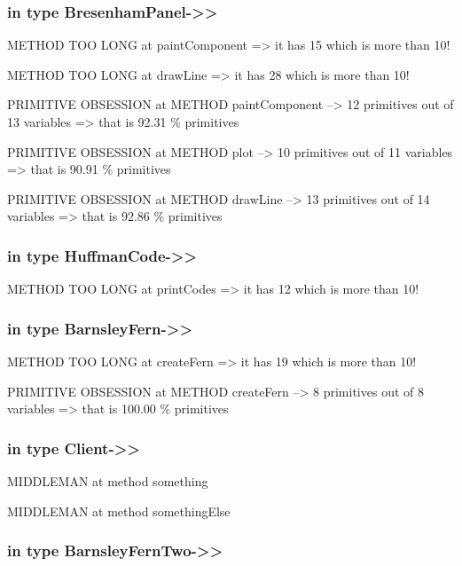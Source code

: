 \documentclass[a4paper]{article}
\begin{document}
\begin{flushleft}
	\subsubsection{in type
		BresenhamPanel-\textgreater{}\textgreater{}}\label{in-type-bresenhampanel-}

	METHOD TOO LONG at paintComponent =\textgreater{} it has 15 which is
	more than 10!

	METHOD TOO LONG at drawLine =\textgreater{} it has 28 which is more than
	10!

	PRIMITIVE OBSESSION at METHOD paintComponent --\textgreater{} 12
	primitives out of 13 variables =\textgreater{} that is 92.31 \%
	primitives

	PRIMITIVE OBSESSION at METHOD plot --\textgreater{} 10 primitives out of
	11 variables =\textgreater{} that is 90.91 \% primitives

	PRIMITIVE OBSESSION at METHOD drawLine --\textgreater{} 13 primitives
	out of 14 variables =\textgreater{} that is 92.86 \% primitives

	\subsubsection{in type
		HuffmanCode-\textgreater{}\textgreater{}}\label{in-type-huffmancode-}

	METHOD TOO LONG at printCodes =\textgreater{} it has 12 which is more
	than 10!

	\subsubsection{in type
		BarnsleyFern-\textgreater{}\textgreater{}}\label{in-type-barnsleyfern-}

	METHOD TOO LONG at createFern =\textgreater{} it has 19 which is more
	than 10!

	PRIMITIVE OBSESSION at METHOD createFern --\textgreater{} 8 primitives
	out of 8 variables =\textgreater{} that is 100.00 \% primitives

	\subsubsection{in type
		Client-\textgreater{}\textgreater{}}\label{in-type-client-}

	MIDDLEMAN at method something

	MIDDLEMAN at method somethingElse

	\subsubsection{in type
		BarnsleyFernTwo-\textgreater{}\textgreater{}}\label{in-type-barnsleyferntwo-}


\end{flushleft}
\end{document}
